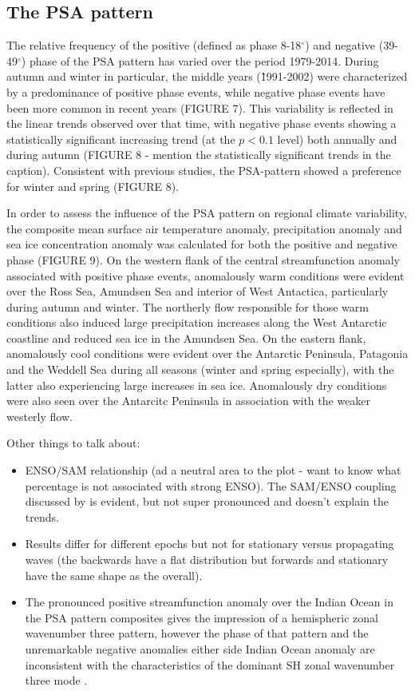 \subsection{The PSA pattern}

The relative frequency of the positive (defined as phase 8-18$^{\circ}$) and negative (39-49$^{\circ}$) phase of the PSA pattern has varied over the period 1979-2014. During autumn and winter in particular, the middle years (\~1991-2002) were characterized by a predominance of positive phase events, while negative phase events have been more common in recent years (FIGURE 7). This variability is reflected in the linear trends observed over that time, with negative phase events showing a statistically significant increasing trend (at the $p < 0.1$ level) both annually and during autumn (FIGURE 8 - mention the statistically significant trends in the caption). Consistent with previous studies, the PSA-pattern showed a preference for winter and spring (FIGURE 8).

In order to assess the influence of the PSA pattern on regional climate variability, the composite mean surface air temperature anomaly, precipitation anomaly and sea ice concentration anomaly was calculated for both the positive and negative phase (FIGURE 9). On the western flank of the central streamfunction anomaly associated with positive phase events, anomalously warm conditions were evident over the Ross Sea, Amundsen Sea and interior of West Antactica, particularly during autumn and winter. The northerly flow responsible for those warm conditions also induced large precipitation increases along the West Antarctic coastline and reduced sea ice in the Amundsen Sea. On the eastern flank, anomalously cool conditions were evident over the Antarctic Peninsula, Patagonia and the Weddell Sea during all seasons (winter and spring especially), with the latter also experiencing large increases in sea ice. Anomalously dry conditions were also seen over the Antarcitc Peninsula in association with the weaker westerly flow. 

Other things to talk about:
\begin{itemize}
\item ENSO/SAM relationship (ad a neutral area to the plot - want to know what percentage is not associated with strong ENSO). The SAM/ENSO coupling discussed by \citet{Fogt2006} is evident, but not super pronounced and doesn't explain the trends.
\item Results differ for different epochs but not for stationary versus propagating waves (the backwards have a flat distribution but forwards and stationary have the same shape as the overall).
\item The pronounced positive streamfunction anomaly over the Indian Ocean in the PSA pattern composites gives the impression of a hemispheric zonal wavenumber three pattern, however the phase of that pattern and the unremarkable negative anomalies either side Indian Ocean anomaly are inconsistent with the characteristics of the dominant SH zonal wavenumber three mode \citep[e.g.][]{Raphael2004,IrvingSimmonds2015}.
\end{itemize}


